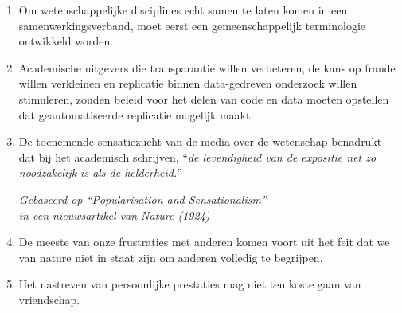 \documentclass[a5paper]{article}
\begin{document}
\begin{enumerate}
\item Om wetenschappelijke disciplines echt samen te laten komen in een samenwerkingsverband, moet eerst een gemeenschappelijk terminologie ontwikkeld worden.

\item Academische uitgevers die transparantie willen verbeteren, de kans op fraude willen verkleinen en replicatie binnen data-gedreven onderzoek willen stimuleren, zouden beleid voor het delen van code en data moeten opstellen dat geautomatiseerde replicatie mogelijk maakt.

\item De toenemende sensatiezucht van de media over de wetenschap benadrukt dat bij het academisch schrijven, ``\textit{de levendigheid van de expositie net zo noodzakelijk is als de helderheid.}''
\begin{flushright}
  \vspace{-1.75mm}
  \textit{Gebaseerd op ``Popularisation and Sensationalism''\\ in een nieuwsartikel van Nature (1924)}
  \vspace{-1mm}
  \end{flushright}  

\item De meeste van onze frustraties met anderen komen voort uit het feit dat we van nature niet in staat zijn om anderen volledig te begrijpen.


\item Het nastreven van persoonlijke prestaties mag niet ten koste gaan van vriendschap.

\end{enumerate}
\end{document}
